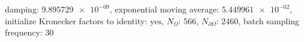 damping: $\num[scientific-notation=true]{9.895729e-09}$, exponential moving average: $\num[scientific-notation=true]{5.449961e-02}$, initialize Kronecker factors to identity: $\text{yes}$, $N_{\Omega}$: $\num[scientific-notation=false]{566}$, $N_{\partial\Omega}$: $\num[scientific-notation=false]{2460}$, batch sampling frequency: $\num[scientific-notation=false]{30}$